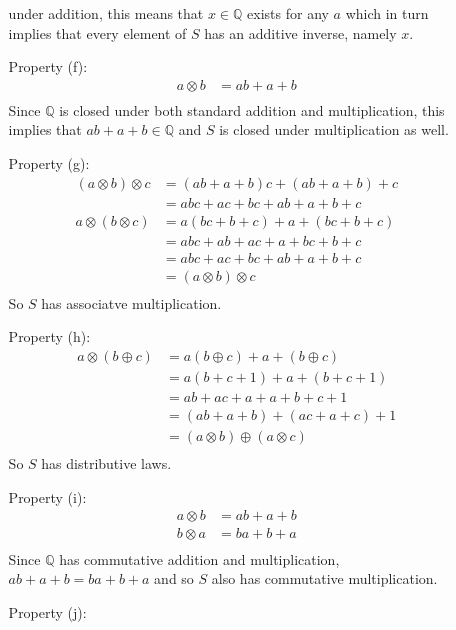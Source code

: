 \documentclass{article}
\begin{document}
\begin{enumerate}
\begin{enumerate}
					under addition, this means that $x \in \mathbb{Q}$ exists for any $a$ which in 
					turn implies that every element of $S$ has an additive inverse, namely $x$.
				\item [Property (f):]
					\begin{align*}
						a \otimes b & = ab + a + b \\
					\end{align*}
					Since $\mathbb{Q}$ is closed under both standard addition and multiplication, 
					this implies that $ab + a + b \in \mathbb{Q}$ and $S$ is closed under 
					multiplication as well.
				\item [Property (g):]
					\begin{align*}
						(a \otimes b) \otimes c & = (ab + a + b)c + (ab + a + b) + c \\
												& = abc + ac + bc + ab + a + b + c \\
						a \otimes (b \otimes c) & = a(bc + b + c) + a + (bc + b + c) \\
												& = abc + ab + ac + a + bc + b + c \\
												& = abc + ac + bc + ab + a + b + c \\
												& = (a \otimes b) \otimes c \\
					\end{align*}
					So $S$ has associatve multiplication.
				\item [Property (h):]
					\begin{align*}
						a \otimes (b \oplus c) & = a(b \oplus c) + a + (b \oplus c) \\
											   & = a(b + c + 1) + a + (b + c + 1) \\
											   & = ab + ac + a + a + b + c + 1 \\
											   & = (ab + a + b) + (ac + a + c) + 1 \\
											   & = (a \otimes b) \oplus (a \otimes c) \\
					\end{align*}
					So $S$ has distributive laws.
				\item [Property (i):]
					\begin{align*}
						a \otimes b & = ab + a + b \\
						b \otimes a & = ba + b + a \\
					\end{align*}
					Since $\mathbb{Q}$ has commutative addition and multiplication, 
					$ab + a + b = ba + b + a$ and so $S$ also has commutative multiplication.
				\item [Property (j):]

\end{enumerate}
\end{enumerate}
\end{document}
